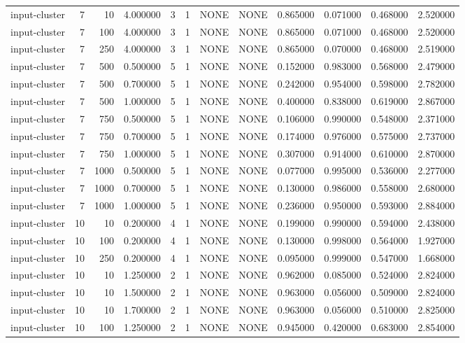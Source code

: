 \begin{tabular}{lrrrllllrrrr}
input-cluster & 7 & 10 & 4.000000 & 3 & 1 & NONE & NONE & 0.865000 & 0.071000 & 0.468000 & 2.520000 \\
input-cluster & 7 & 100 & 4.000000 & 3 & 1 & NONE & NONE & 0.865000 & 0.071000 & 0.468000 & 2.520000 \\
input-cluster & 7 & 250 & 4.000000 & 3 & 1 & NONE & NONE & 0.865000 & 0.070000 & 0.468000 & 2.519000 \\
input-cluster & 7 & 500 & 0.500000 & 5 & 1 & NONE & NONE & 0.152000 & 0.983000 & 0.568000 & 2.479000 \\
input-cluster & 7 & 500 & 0.700000 & 5 & 1 & NONE & NONE & 0.242000 & 0.954000 & 0.598000 & 2.782000 \\
input-cluster & 7 & 500 & 1.000000 & 5 & 1 & NONE & NONE & 0.400000 & 0.838000 & 0.619000 & 2.867000 \\
input-cluster & 7 & 750 & 0.500000 & 5 & 1 & NONE & NONE & 0.106000 & 0.990000 & 0.548000 & 2.371000 \\
input-cluster & 7 & 750 & 0.700000 & 5 & 1 & NONE & NONE & 0.174000 & 0.976000 & 0.575000 & 2.737000 \\
input-cluster & 7 & 750 & 1.000000 & 5 & 1 & NONE & NONE & 0.307000 & 0.914000 & 0.610000 & 2.870000 \\
input-cluster & 7 & 1000 & 0.500000 & 5 & 1 & NONE & NONE & 0.077000 & 0.995000 & 0.536000 & 2.277000 \\
input-cluster & 7 & 1000 & 0.700000 & 5 & 1 & NONE & NONE & 0.130000 & 0.986000 & 0.558000 & 2.680000 \\
input-cluster & 7 & 1000 & 1.000000 & 5 & 1 & NONE & NONE & 0.236000 & 0.950000 & 0.593000 & 2.884000 \\
input-cluster & 10 & 10 & 0.200000 & 4 & 1 & NONE & NONE & 0.199000 & 0.990000 & 0.594000 & 2.438000 \\
input-cluster & 10 & 100 & 0.200000 & 4 & 1 & NONE & NONE & 0.130000 & 0.998000 & 0.564000 & 1.927000 \\
input-cluster & 10 & 250 & 0.200000 & 4 & 1 & NONE & NONE & 0.095000 & 0.999000 & 0.547000 & 1.668000 \\
input-cluster & 10 & 10 & 1.250000 & 2 & 1 & NONE & NONE & 0.962000 & 0.085000 & 0.524000 & 2.824000 \\
input-cluster & 10 & 10 & 1.500000 & 2 & 1 & NONE & NONE & 0.963000 & 0.056000 & 0.509000 & 2.824000 \\
input-cluster & 10 & 10 & 1.700000 & 2 & 1 & NONE & NONE & 0.963000 & 0.056000 & 0.510000 & 2.825000 \\
input-cluster & 10 & 100 & 1.250000 & 2 & 1 & NONE & NONE & 0.945000 & 0.420000 & 0.683000 & 2.854000 \\

\end{tabular}
